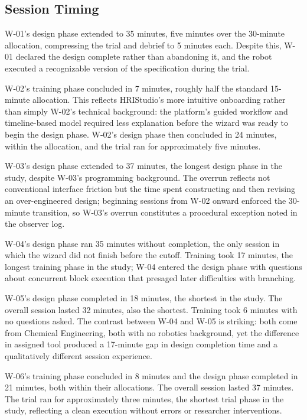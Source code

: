 \subsection{Session Timing}

W-01's design phase extended to 35 minutes, five minutes over the 30-minute allocation, compressing the trial and debrief to 5 minutes each. Despite this, W-01 declared the design complete rather than abandoning it, and the robot executed a recognizable version of the specification during the trial.

W-02's training phase concluded in 7 minutes, roughly half the standard 15-minute allocation. This reflects HRIStudio's more intuitive onboarding rather than simply W-02's technical background: the platform's guided workflow and timeline-based model required less explanation before the wizard was ready to begin the design phase. W-02's design phase then concluded in 24 minutes, within the allocation, and the trial ran for approximately five minutes.

W-03's design phase extended to 37 minutes, the longest design phase in the study, despite W-03's programming background. The overrun reflects not conventional interface friction but the time spent constructing and then revising an over-engineered design; beginning sessions from W-02 onward enforced the 30-minute transition, so W-03's overrun constitutes a procedural exception noted in the observer log.

W-04's design phase ran 35 minutes without completion, the only session in which the wizard did not finish before the cutoff. Training took 17 minutes, the longest training phase in the study; W-04 entered the design phase with questions about concurrent block execution that presaged later difficulties with branching.

W-05's design phase completed in 18 minutes, the shortest in the study. The overall session lasted 32 minutes, also the shortest. Training took 6 minutes with no questions asked. The contrast between W-04 and W-05 is striking: both come from Chemical Engineering, both with no robotics background, yet the difference in assigned tool produced a 17-minute gap in design completion time and a qualitatively different session experience.

W-06's training phase concluded in 8 minutes and the design phase completed in 21 minutes, both within their allocations. The overall session lasted 37 minutes. The trial ran for approximately three minutes, the shortest trial phase in the study, reflecting a clean execution without errors or researcher interventions.

